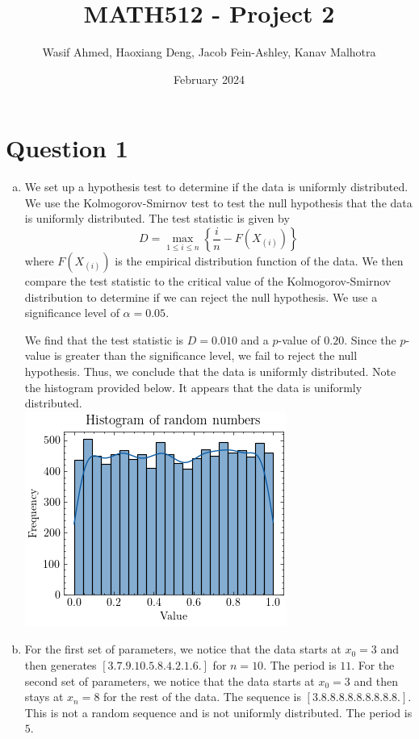 \documentclass{article}
\title{MATH512 - Project 2}
\author{Wasif Ahmed, Haoxiang Deng, Jacob Fein-Ashley, Kanav Malhotra}
\date{February 2024}
\begin{document}
\maketitle

\section*{Question 1}
\begin{enumerate}[(a)]
    \item 
        We set up a hypothesis test to determine if the data is uniformly distributed. We use
        the Kolmogorov-Smirnov test to test the null hypothesis that the data is uniformly
        distributed. The test statistic is given by
        \[
            D = \max_{1 \leq i \leq n} \left\{ \frac{i}{n} - F(X_{(i)}) \right\}
        \]
        where $F(X_{(i)})$ is the empirical distribution function of the data. We then compare
        the test statistic to the critical value of the Kolmogorov-Smirnov distribution to
        determine if we can reject the null hypothesis. We use a significance level of $\alpha = 0.05$.

        We find that the test statistic is $D = 0.010$ and a $p$-value of $0.20$. Since the $p$-value
        is greater than the significance level, we fail to reject the null hypothesis. Thus, we
        conclude that the data is uniformly distributed. Note the histogram provided below. 
        It appears that the data is uniformly distributed.\\
        \includegraphics[scale=0.7]{imgs/1a.png}

    \item
        For the first set of parameters, we notice that the data starts at $x_0 = 3$ and then
        generates $[ 3.  7.  9. 10.  5.  8.  4.  2.  1.  6.]$ for $n = 10$. The period is $11$.
        For the second set of parameters, we notice that
        the data starts at $x_0 = 3$ and then stays at $x_n = 8$ for the rest of the data. The sequence is 
        $[3. 8. 8. 8. 8. 8. 8. 8. 8. 8.]$. This is not a random sequence and is not uniformly distributed.
        The period is $5$.


\end{enumerate}
\end{document}
